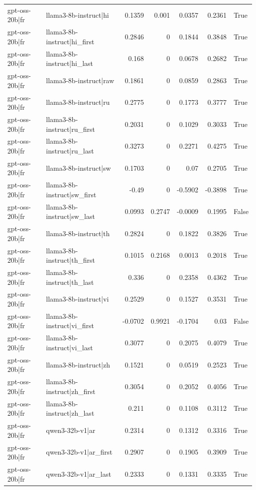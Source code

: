\begin{table}
\begin{tabular}{l l r r r r l}
gpt-oss-20b|fr & llama3-8b-instruct|hi & 0.1359 & 0.001 & 0.0357 & 0.2361 & True \\
gpt-oss-20b|fr & llama3-8b-instruct|hi_first & 0.2846 & 0 & 0.1844 & 0.3848 & True \\
gpt-oss-20b|fr & llama3-8b-instruct|hi_last & 0.168 & 0 & 0.0678 & 0.2682 & True \\
gpt-oss-20b|fr & llama3-8b-instruct|raw & 0.1861 & 0 & 0.0859 & 0.2863 & True \\
gpt-oss-20b|fr & llama3-8b-instruct|ru & 0.2775 & 0 & 0.1773 & 0.3777 & True \\
gpt-oss-20b|fr & llama3-8b-instruct|ru_first & 0.2031 & 0 & 0.1029 & 0.3033 & True \\
gpt-oss-20b|fr & llama3-8b-instruct|ru_last & 0.3273 & 0 & 0.2271 & 0.4275 & True \\
gpt-oss-20b|fr & llama3-8b-instruct|sw & 0.1703 & 0 & 0.07 & 0.2705 & True \\
gpt-oss-20b|fr & llama3-8b-instruct|sw_first & -0.49 & 0 & -0.5902 & -0.3898 & True \\
gpt-oss-20b|fr & llama3-8b-instruct|sw_last & 0.0993 & 0.2747 & -0.0009 & 0.1995 & False \\
gpt-oss-20b|fr & llama3-8b-instruct|th & 0.2824 & 0 & 0.1822 & 0.3826 & True \\
gpt-oss-20b|fr & llama3-8b-instruct|th_first & 0.1015 & 0.2168 & 0.0013 & 0.2018 & True \\
gpt-oss-20b|fr & llama3-8b-instruct|th_last & 0.336 & 0 & 0.2358 & 0.4362 & True \\
gpt-oss-20b|fr & llama3-8b-instruct|vi & 0.2529 & 0 & 0.1527 & 0.3531 & True \\
gpt-oss-20b|fr & llama3-8b-instruct|vi_first & -0.0702 & 0.9921 & -0.1704 & 0.03 & False \\
gpt-oss-20b|fr & llama3-8b-instruct|vi_last & 0.3077 & 0 & 0.2075 & 0.4079 & True \\
gpt-oss-20b|fr & llama3-8b-instruct|zh & 0.1521 & 0 & 0.0519 & 0.2523 & True \\
gpt-oss-20b|fr & llama3-8b-instruct|zh_first & 0.3054 & 0 & 0.2052 & 0.4056 & True \\
gpt-oss-20b|fr & llama3-8b-instruct|zh_last & 0.211 & 0 & 0.1108 & 0.3112 & True \\
gpt-oss-20b|fr & qwen3-32b-v1|ar & 0.2314 & 0 & 0.1312 & 0.3316 & True \\
gpt-oss-20b|fr & qwen3-32b-v1|ar_first & 0.2907 & 0 & 0.1905 & 0.3909 & True \\
gpt-oss-20b|fr & qwen3-32b-v1|ar_last & 0.2333 & 0 & 0.1331 & 0.3335 & True \\

\end{tabular}
\end{table}
